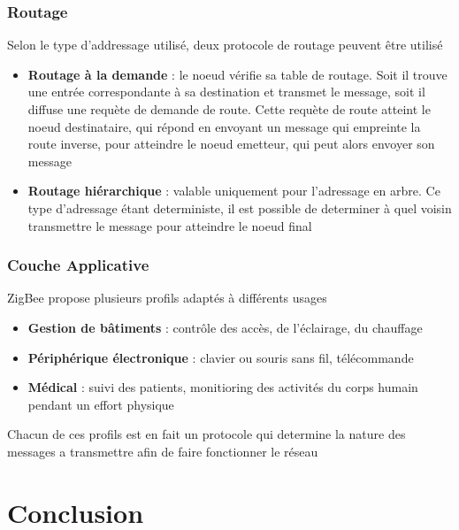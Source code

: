 \documentclass{beamer}
\begin{document}
  \begin{frame}
    \frametitle{Routage}
    \begin{block}{Selon le type d'addressage utilisé, deux protocole de routage peuvent être utilisé}
      \begin{itemize}
        \item \textbf{Routage à la demande} : le noeud vérifie sa table de routage. Soit il trouve une entrée correspondante à sa destination et transmet le message, soit il diffuse une requète de demande de route. Cette requète de route atteint le noeud destinataire, qui répond en envoyant un message qui empreinte la route inverse, pour atteindre le noeud emetteur, qui peut alors envoyer son message
        \item \textbf{Routage hiérarchique} : valable uniquement pour l'adressage en arbre. Ce type d'adressage étant deterministe, il est possible de determiner à quel voisin transmettre le message pour atteindre le noeud final
      \end{itemize}
    \end{block}
  \end{frame}
  
  \begin{frame}
   \frametitle{Couche Applicative}
   \begin{block}{ZigBee propose plusieurs profils adaptés à différents usages}
     \begin{itemize}
      \item \textbf{Gestion de bâtiments} : contrôle des accès, de l'éclairage, du chauffage
      \item \textbf{Périphérique électronique} : clavier ou souris sans fil, télécommande
      \item \textbf{Médical} : suivi des patients, monitioring des activités du corps humain pendant un effort physique
     \end{itemize}
     
     Chacun de ces profils est en fait un protocole qui determine la nature des messages a transmettre afin de faire fonctionner le réseau

   \end{block}

  \end{frame}


  \section{Conclusion}
\end{document}
